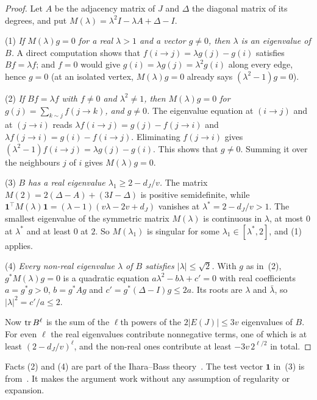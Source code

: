 \begin{proof}
Let $A$ be the adjacency matrix of $J$ and $\Delta$ the diagonal matrix of its degrees, and put
$M(\lambda)=\lambda^{2}I-\lambda A+\Delta-I$.

(1) \emph{If $M(\lambda)g=0$ for a real $\lambda>1$ and a vector $g\ne0$, then $\lambda$ is an
eigenvalue of $B$.} A direct computation shows that $f(i\to j)=\lambda g(j)-g(i)$ satisfies
$Bf=\lambda f$; and $f=0$ would give $g(i)=\lambda g(j)=\lambda^{2}g(i)$ along every edge, hence
$g=0$ (at an isolated vertex, $M(\lambda)g=0$ already says $(\lambda^{2}-1)g=0$).

(2) \emph{If $Bf=\lambda f$ with $f\ne0$ and $\lambda^{2}\ne1$, then $M(\lambda)g=0$ for
$g(j)=\sum_{k\sim j}f(j\to k)$, and $g\ne0$.} The eigenvalue equation at $(i\to j)$ and at
$(j\to i)$ reads $\lambda f(i\to j)=g(j)-f(j\to i)$ and $\lambda f(j\to i)=g(i)-f(i\to j)$.
Eliminating $f(j\to i)$ gives $(\lambda^{2}-1)f(i\to j)=\lambda g(j)-g(i)$. This shows that
$g\ne0$. Summing it over the neighbours $j$ of $i$ gives $M(\lambda)g=0$.

(3) \emph{$B$ has a real eigenvalue $\lambda_1\ge2-d_J/v$.} The matrix
$M(2)=2(\Delta-A)+(3I-\Delta)$ is positive semidefinite, while
$\mathbf{1}^{\!\top}M(\lambda)\mathbf{1}=(\lambda-1)(v\lambda-2v+d_J)$ vanishes at
$\lambda^{*}=2-d_J/v>1$. The smallest eigenvalue of the symmetric matrix $M(\lambda)$ is continuous
in $\lambda$, at most $0$ at $\lambda^{*}$ and at least $0$ at $2$. So $M(\lambda_1)$ is singular for
some $\lambda_1\in[\lambda^{*},2]$, and (1) applies.

(4) \emph{Every non-real eigenvalue $\lambda$ of $B$ satisfies $|\lambda|\le\sqrt2$.} With $g$ as
in~(2), $g^{*}M(\lambda)g=0$ is a quadratic equation $a\lambda^{2}-b\lambda+c'=0$ with real
coefficients $a=g^{*}g>0$, $b=g^{*}Ag$ and $c'=g^{*}(\Delta-I)g\le2a$. Its roots are $\lambda$ and
$\bar\lambda$, so $|\lambda|^{2}=c'/a\le2$.

Now $\operatorname{tr} B^{\ell}$ is the sum of the $\ell$th powers of the $2|E(J)|\le3v$ eigenvalues of $B$. For
even $\ell$ the real eigenvalues contribute nonnegative terms, one of which is at least
$(2-d_J/v)^{\ell}$, and the non-real ones contribute at least $-3v\,2^{\ell/2}$ in total.
\end{proof}

Facts (2) and (4) are part of the Ihara--Bass theory~\cite{Bass,KS}. The test vector $\mathbf{1}$
in~(3) is from~\cite{KNT}. It makes the argument work without any assumption of regularity or
expansion.

